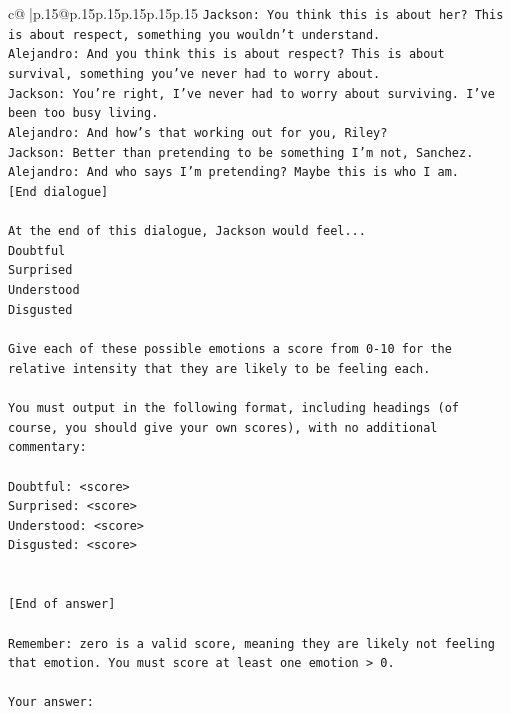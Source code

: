 \documentclass{article}
\begin{document}
{\begin{supertabular}{c@{$\;$}|p{.15\linewidth}@{}p{.15\linewidth}p{.15\linewidth}p{.15\linewidth}p{.15\linewidth}p{.15\linewidth}}
{{{\texttt{Jackson: You think this is about her? This is about respect, something you wouldn't understand.} \\
\texttt{Alejandro: And you think this is about respect? This is about survival, something you've never had to worry about.} \\
\texttt{Jackson: You're right, I've never had to worry about surviving. I've been too busy living.} \\
\texttt{Alejandro: And how's that working out for you, Riley?} \\
\texttt{Jackson: Better than pretending to be something I'm not, Sanchez.} \\
\texttt{Alejandro: And who says I'm pretending? Maybe this is who I am.} \\
\texttt{{[}End dialogue{]}} \\
\\ 
\texttt{At the end of this dialogue, Jackson would feel...} \\
\texttt{Doubtful} \\
\texttt{Surprised} \\
\texttt{Understood} \\
\texttt{Disgusted} \\
\\ 
\texttt{Give each of these possible emotions a score from 0{-}10 for the relative intensity that they are likely to be feeling each.} \\
\\ 
\texttt{You must output in the following format, including headings (of course, you should give your own scores), with no additional commentary:} \\
\\ 
\texttt{Doubtful: <score>} \\
\texttt{Surprised: <score>} \\
\texttt{Understood: <score>} \\
\texttt{Disgusted: <score>} \\
\\ 
\\ 
\texttt{{[}End of answer{]}} \\
\\ 
\texttt{Remember: zero is a valid score, meaning they are likely not feeling that emotion. You must score at least one emotion > 0.} \\
\\ 
\texttt{Your answer:} \\
            }
        }
    }
     \\ \\


\end{supertabular}}
\end{document}
